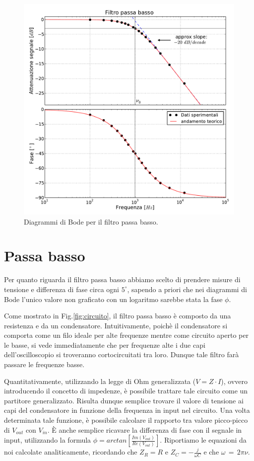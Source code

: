\begin{figure}
    \includegraphics[width=120mm]{low.pdf}
    \caption{Diagrammi di Bode per il filtro passa basso.}
    \label{fig:low}
\end{figure}
\section{Passa basso}
Per quanto riguarda il filtro passa basso abbiamo scelto di prendere misure di tensione e differenza di fase circa ogni $5^{\circ}$, sapendo a priori che nei diagrammi di Bode l'unico valore non graficato con un logaritmo sarebbe stata la fase $\phi$.

Come mostrato in Fig.\ref{fig:circuito}, il filtro passa basso è composto da una resistenza e da un condensatore. Intuitivamente, poichè il condensatore si comporta come un filo ideale per alte frequenze mentre come circuito aperto per le basse, si vede immediatamente che per frequenze alte i due capi dell'oscilloscopio si troveranno cortocircuitati tra loro. Dunque tale filtro farà passare le frequenze basse.

Quantitativamente, utilizzando la legge di Ohm generalizzata ($V=Z \cdot I$), ovvero introducendo il concetto di impedenze, è possibile trattare tale circuito come un partitore generalizzato. Risulta dunque semplice trovare il valore di tensione ai capi del condensatore in funzione della frequenza in input nel circuito. Una volta determinata tale funzione, è possibile calcolare il rapporto tra valore picco-picco di $V_{out}$ con $V_{in}$. \`E anche semplice ricavare la differenza di fase con il segnale in input, utilizzando la formula $\phi=arctan[\frac{Im(V_{out})}{Re(V_{out})}]$. Riportiamo le equazioni da noi calcolate analiticamente, ricordando che $Z_R=R$ e $Z_C=-\frac{j}{\omega C}$ e che $\omega\,=\,2\pi\nu$.

